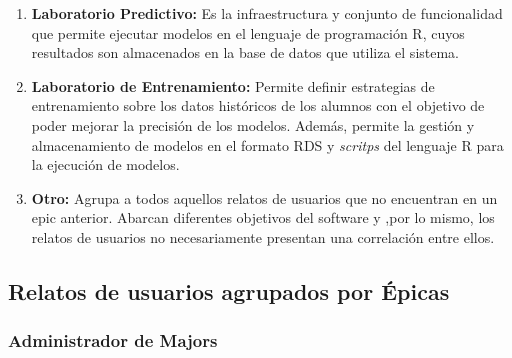 \begin{enumerate}
	\item \textbf{Laboratorio Predictivo:} Es la infraestructura y conjunto de funcionalidad que permite ejecutar modelos en el lenguaje de programación R, cuyos resultados son almacenados en la base de datos que utiliza el sistema.
	\item \textbf{Laboratorio de Entrenamiento:} Permite definir estrategias de entrenamiento sobre los datos históricos de los alumnos con el objetivo de poder mejorar la precisión de los modelos. Además, permite la gestión y almacenamiento de modelos en el formato RDS y \textit{scritps}  del lenguaje R para la ejecución de modelos.
	\item \textbf{Otro:} Agrupa a todos aquellos relatos de usuarios que no encuentran en un epic anterior. Abarcan diferentes objetivos del software y ,por lo mismo, los relatos de usuarios no necesariamente presentan una correlación entre ellos.
\end{enumerate}

\subsection{Relatos de usuarios agrupados por Épicas \label{sec:detailed_user_stories}}

\subsubsection{Administrador de Majors}

